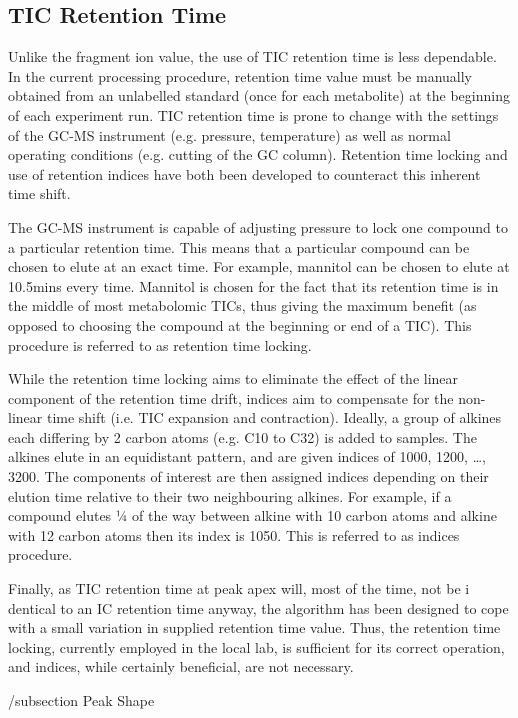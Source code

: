 \subsection
{TIC Retention Time}
Unlike the fragment ion value, the use of TIC retention time is less dependable. 
In the current processing procedure, retention time value must be manually 
obtained from an unlabelled standard (once for each metabolite) at the 
beginning of each experiment run. TIC retention time is prone to change with 
the settings of the GC-MS instrument (e.g. pressure, temperature) as well as 
normal operating conditions (e.g. cutting of the GC column). Retention time 
locking and use of retention indices have both been developed to counteract 
this inherent time shift. 

The GC-MS instrument is capable of adjusting pressure to lock one compound to a 
particular retention time. This means that a particular compound can be chosen 
to elute at an exact time. For example, mannitol can be chosen to elute 
at 10.5mins every time. Mannitol is chosen for the fact that its retention time 
is in the middle of most metabolomic TICs, thus giving the maximum benefit (as 
opposed to choosing the compound at the beginning or end of a TIC). This 
procedure is referred to as retention time locking.

While the retention time locking aims to eliminate the effect of the linear 
component of the retention time drift, indices aim to compensate for the 
non-linear time shift (i.e. TIC expansion and contraction). Ideally, a group 
of alkines each differing by 2 carbon atoms (e.g. C10 to C32) is added to 
samples. The alkines elute in an equidistant pattern, and are given indices of 
1000, 1200, …, 3200. The components of interest are then assigned indices 
depending on their elution time relative to their two neighbouring alkines. For 
example, if a compound elutes ¼ of the way between alkine with 10 carbon atoms 
and alkine with 12 carbon atoms then its index is 1050. This is referred to as 
indices procedure.

Finally, as TIC retention time at peak apex will, most of the time, not be i
dentical to an IC retention time anyway, the algorithm has been designed to 
cope with a small variation in supplied retention time value. Thus, the 
retention time locking, currently employed in the local lab, is sufficient 
for its correct operation, and indices, while certainly beneficial, are not 
necessary.

/subsection
{Peak Shape}

